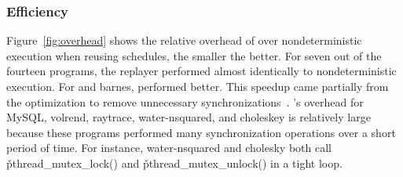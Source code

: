 \subsubsection{Efficiency} \label{sec:tern-efficient}

Figure~\ref{fig:overhead} shows the relative overhead of \tern over
nondeterministic execution when reusing schedules, the smaller the better.  For seven out of
the fourteen programs, the replayer performed almost identically to
nondeterministic execution. For \pbzip and barnes, \tern performed
better.  This speedup came partially from the optimization to remove
unnecessary synchronizations~\cite{cui:tern:osdi10}.  \tern's overhead
for MySQL, volrend, raytrace, water-nsquared, and choleskey is relatively
large because these programs performed many synchronization operations
over a short period of time.  For instance, water-nsquared and cholesky
both call \v{pthread\_mutex\_lock()} and \v{pthread\_mutex\_unlock()} in a
tight loop.




